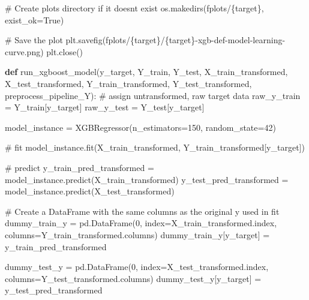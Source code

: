 \documentclass[
  letterpaper,
  DIV=11,
  numbers=noendperiod]{scrartcl}
\newenvironment{Shaded}{\begin{snugshade}}{\end{snugshade}}
\newcommand{\CommentTok}[1]{\textcolor[rgb]{0.37,0.37,0.37}{#1}}
\newcommand{\DecValTok}[1]{\textcolor[rgb]{0.68,0.00,0.00}{#1}}
\newcommand{\KeywordTok}[1]{\textcolor[rgb]{0.00,0.23,0.31}{\textbf{#1}}}
\newcommand{\NormalTok}[1]{\textcolor[rgb]{0.00,0.23,0.31}{#1}}
\newcommand{\OperatorTok}[1]{\textcolor[rgb]{0.37,0.37,0.37}{#1}}
\newcommand{\SpecialCharTok}[1]{\textcolor[rgb]{0.37,0.37,0.37}{#1}}
\newcommand{\SpecialStringTok}[1]{\textcolor[rgb]{0.13,0.47,0.30}{#1}}
\newcommand{\VariableTok}[1]{\textcolor[rgb]{0.07,0.07,0.07}{#1}}
\begin{document}
\begin{Shaded}
\begin{Highlighting}[]
    \CommentTok{\# Create \textquotesingle{}plots\textquotesingle{} directory if it doesn\textquotesingle{}t exist}
\NormalTok{    os.makedirs(}\SpecialStringTok{f\textquotesingle{}plots/}\SpecialCharTok{\{}\NormalTok{target}\SpecialCharTok{\}}\SpecialStringTok{\textquotesingle{}}\NormalTok{, exist\_ok}\OperatorTok{=}\VariableTok{True}\NormalTok{)}

    \CommentTok{\# Save the plot}
\NormalTok{    plt.savefig(}\SpecialStringTok{f\textquotesingle{}plots/}\SpecialCharTok{\{}\NormalTok{target}\SpecialCharTok{\}}\SpecialStringTok{/}\SpecialCharTok{\{}\NormalTok{target}\SpecialCharTok{\}}\SpecialStringTok{{-}xgb{-}def{-}model{-}learning{-}curve.png\textquotesingle{}}\NormalTok{)}
\NormalTok{    plt.close()}

\KeywordTok{def}\NormalTok{ run\_xgboost\_model(y\_target, Y\_train, Y\_test, X\_train\_transformed, X\_test\_transformed, Y\_train\_transformed, Y\_test\_transformed, preprocess\_pipeline\_Y):}
    \CommentTok{\# assign untransformed, raw target data}
\NormalTok{    raw\_y\_train }\OperatorTok{=}\NormalTok{ Y\_train[y\_target]}
\NormalTok{    raw\_y\_test }\OperatorTok{=}\NormalTok{ Y\_test[y\_target]}

\NormalTok{    model\_instance }\OperatorTok{=}\NormalTok{ XGBRegressor(n\_estimators}\OperatorTok{=}\DecValTok{150}\NormalTok{, random\_state}\OperatorTok{=}\DecValTok{42}\NormalTok{)}

    \CommentTok{\# fit}
\NormalTok{    model\_instance.fit(X\_train\_transformed, Y\_train\_transformed[y\_target])}
    
    \CommentTok{\# predict}
\NormalTok{    y\_train\_pred\_transformed }\OperatorTok{=}\NormalTok{ model\_instance.predict(X\_train\_transformed)}
\NormalTok{    y\_test\_pred\_transformed }\OperatorTok{=}\NormalTok{ model\_instance.predict(X\_test\_transformed)}

    \CommentTok{\# Create a DataFrame with the same columns as the original y used in fit}
\NormalTok{    dummy\_train\_y }\OperatorTok{=}\NormalTok{ pd.DataFrame(}\DecValTok{0}\NormalTok{, index}\OperatorTok{=}\NormalTok{X\_train\_transformed.index, columns}\OperatorTok{=}\NormalTok{Y\_train\_transformed.columns)}
\NormalTok{    dummy\_train\_y[y\_target] }\OperatorTok{=}\NormalTok{ y\_train\_pred\_transformed}

\NormalTok{    dummy\_test\_y }\OperatorTok{=}\NormalTok{ pd.DataFrame(}\DecValTok{0}\NormalTok{, index}\OperatorTok{=}\NormalTok{X\_test\_transformed.index, columns}\OperatorTok{=}\NormalTok{Y\_test\_transformed.columns)}
\NormalTok{    dummy\_test\_y[y\_target] }\OperatorTok{=}\NormalTok{ y\_test\_pred\_transformed}


\end{Highlighting}
\end{Shaded}
\end{document}
